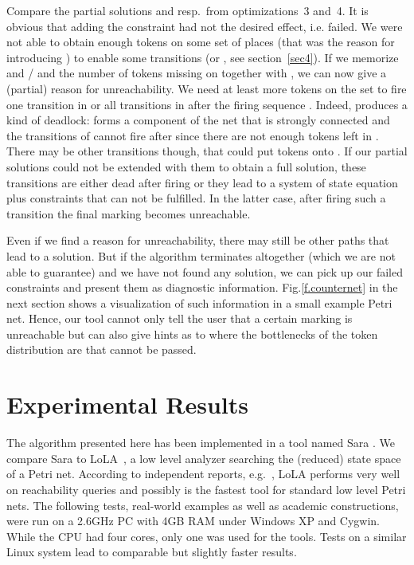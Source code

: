 \documentclass{LMCS}
\begin{document}
Compare the partial solutions  and 
resp.\  from optimizations~3 and~4. It is obvious that
adding the constraint  had not the desired effect, i.e.  failed. We were not able to
obtain enough tokens on some set of places  (that was the reason for introducing ) to
enable some transitions  (or , see section~\ref{sec4}). If we memorize  and 
/ and the number of tokens  missing on  together with , we can now give a 
(partial) reason for unreachability. We need at least  more tokens on the set 
to fire one transition in  or all transitions in  after the firing sequence .
Indeed,  produces a kind of deadlock:  forms a component of the net 
that is strongly connected and the transitions of  cannot fire after 
since there are not enough tokens left in . There may be other transitions though, that could put
tokens onto . If our partial solutions could not be extended with them to obtain a
full solution, these transitions are either dead after firing  or they lead to a
system of state equation plus constraints that can not be fulfilled. In the latter case,
after firing such a transition the final marking becomes unreachable.

Even if we find a reason for unreachability, there may still be other paths that lead
to a solution. But if the algorithm terminates altogether (which we are not able to 
guarantee) and we have not found any solution, we can pick up our failed constraints
and present them as diagnostic information. Fig.\ref{f.counternet} in the next section shows a visualization
of such information in a small example Petri net. Hence, our tool cannot
only tell the user that a certain marking is unreachable but can also give hints as to where the
bottlenecks of the token distribution are that cannot be passed.  


\section{Experimental Results}\label{sec8}

The algorithm presented here has been implemented in a tool named Sara \cite{sara}. We compare Sara
to LoLA~\cite{Wolf_2007_icatpn}, a low level analyzer searching the (reduced) state space of a Petri net. According to
independent reports, e.g.~\cite{talcottdill}, LoLA performs very well on reachability queries
and possibly is the fastest tool for standard low level Petri nets.
The following tests, real-world examples as well as academic constructions, were run on a 2.6GHz PC 
with 4GB RAM under Windows XP and Cygwin. While the CPU had four cores, only one was used for the tools.
Tests on a similar Linux system lead to comparable but slightly faster results.
\end{document}
